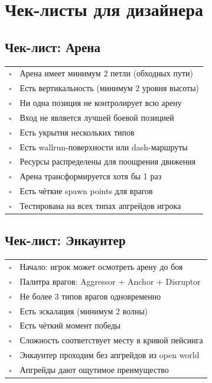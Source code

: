 \documentclass[a4paper,11pt]{report}
\begin{document}
\chapter{Чек-листы для дизайнера}

\section{Чек-лист: Арена}

\begin{table}[H]
\centering
\begin{tabularx}{\textwidth}{@{}cX@{}}
\toprule
$\square$ & Арена имеет минимум 2 петли (обходных пути) \\
$\square$ & Есть вертикальность (минимум 2 уровня высоты) \\
$\square$ & Ни одна позиция не контролирует всю арену \\
$\square$ & Вход не является лучшей боевой позицией \\
$\square$ & Есть укрытия нескольких типов \\
$\square$ & Есть wallrun-поверхности или dash-маршруты \\
$\square$ & Ресурсы распределены для поощрения движения \\
$\square$ & Арена трансформируется хотя бы 1 раз \\
$\square$ & Есть чёткие spawn points для врагов \\
$\square$ & Тестирована на всех типах апгрейдов игрока \\
\bottomrule
\end{tabularx}
\end{table}

\section{Чек-лист: Энкаунтер}

\begin{table}[H]
\centering
\begin{tabularx}{\textwidth}{@{}cX@{}}
\toprule
$\square$ & Начало: игрок может осмотреть арену до боя \\
$\square$ & Палитра врагов: Aggressor + Anchor + Disruptor \\
$\square$ & Не более 3 типов врагов одновременно \\
$\square$ & Есть эскалация (минимум 2 волны) \\
$\square$ & Есть чёткий момент победы \\
$\square$ & Сложность соответствует месту в кривой пейсинга \\
$\square$ & Энкаунтер проходим без апгрейдов из open world \\
$\square$ & Апгрейды дают ощутимое преимущество \\
\bottomrule
\end{tabularx}
\end{table}
\end{document}
